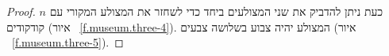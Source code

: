 \begin{proof}
%
%  
%
%
%
%  
%
%
%
%

כעת ניתן להדביק את שני המצולעים ביחד כדי לשחזר את המצולע המקורי עם
$n$
קודקודים (איור%
~\ref{f.museum.three-4}).
 המצולע יהיה צבוע בשלושה צבעים (איור%
~\ref{f.museum.three-5}). 
\end{proof}

